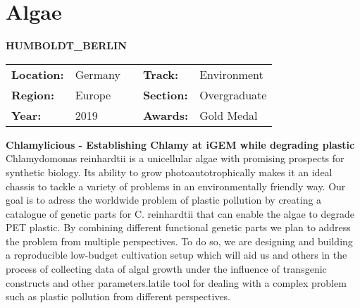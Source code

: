 \section{Algae}

\textbf{\uppercase{Humboldt\_Berlin}} 
\FloatBarrier
\begin{table}[h]
\begin{tabular}{lllll}
\textbf{Location:} & Germany & \multicolumn{1}{|l}{} & \textbf{Track:}   & Environment \\
\textbf{Region:}   & Europe   & \multicolumn{1}{|l}{} & \textbf{Section:} & Overgraduate \\
\textbf{Year:}     & 2019   & \multicolumn{1}{|l}{} & \textbf{Awards:}  & Gold Medal
\end{tabular}
\end{table} 
\FloatBarrier
\noindent\textbf{Chlamylicious - Establishing Chlamy at iGEM while degrading plastic} \vspace{.2cm}\\ 
Chlamydomonas reinhardtii is a unicellular algae with promising prospects for synthetic biology. Its ability to grow photoautotrophically makes it an ideal chassis to tackle a variety of problems in an environmentally friendly way. Our goal is to adress the worldwide problem of plastic pollution by creating a catalogue of genetic parts for C. reinhardtii that can enable the algae to degrade PET plastic. By combining different functional genetic parts we plan to address the problem from multiple perspectives. To do so, we are designing and building a reproducible low-budget cultivation setup which will aid us and others in the process of collecting data of algal growth under the influence of transgenic constructs and other parameters.latile tool for dealing with a complex problem such as plastic pollution from different perspectives. 
\vspace{2cm} $ $
\pagebreak

